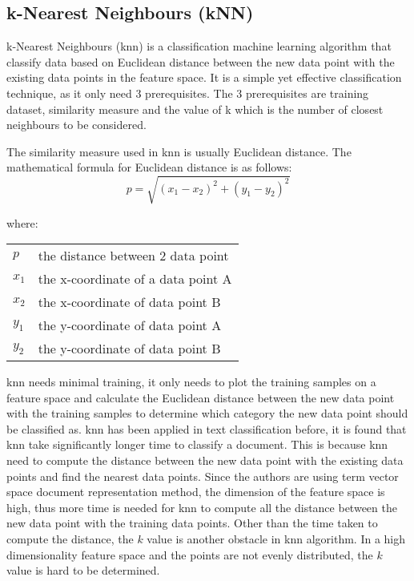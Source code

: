 \subsection{k-Nearest Neighbours (kNN)}
k-Nearest Neighbours (\ac{knn}) is a classification machine learning algorithm that classify data based on Euclidean distance between the new data point with the existing data points in the feature space. It is a simple yet effective classification technique, as it only need 3 prerequisites. The 3 prerequisites are training dataset, similarity measure and the value of k which is the number of closest neighbours to be considered. 

The similarity measure used in \ac{knn} is usually Euclidean distance. The mathematical formula for Euclidean distance is as follows:
\begin{equation}
p = \sqrt{(x_{1} - x_{2})^{2} + (y_{1} - y_{2})^{2}}
\end{equation}

where:
\begin{center}
	\begin{tabular}{l @{ $=$ } l}
		$p$ & the distance between 2 data point\\
		$x_{1}$ & the x-coordinate of a data point A\\
		$x_{2}$ & the x-coordinate of data point B\\
		$y_{1}$ & the y-coordinate of data point A\\
		$y_{2}$ & the y-coordinate of data point B\\
	\end{tabular}
\end{center}
	

\Ac{knn} needs minimal training, it only needs to plot the training samples on a feature space and calculate the Euclidean distance between the new data point with the training samples to determine which category the new data point should be classified as. \Ac{knn} has been applied in text classification before, it is found that \ac{knn} take significantly longer time to classify a document. This is because \ac{knn} need to compute the distance between the new data point with the existing data points and find the nearest data points. Since the authors are using term vector space document representation method, the dimension of the feature space is high, thus more time is needed for \ac{knn} to compute all the distance between the new data point with the training data points. Other than the time taken to compute the distance, the $k$ value is another obstacle in \ac{knn} algorithm. In a high dimensionality feature space and the points are not evenly distributed, the $k$ value is hard to be determined.

